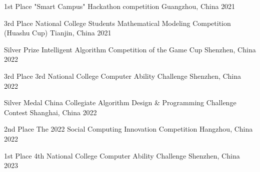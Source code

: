 \begin{cvhonors}

  \cvhonor
    {1st Place} %
    {"Smart Campus" Hackathon competition} %
    {Guangzhou, China} %
    {2021} %

  \cvhonor
    {3rd  Place} %
    {National College Students Mathematical Modeling Competition (Huashu Cup)} %
    {Tianjin, China} %
    {2021} %

  \cvhonor
    {Silver Prize} %
    {Intelligent Algorithm Competition of the Game Cup} %
    {Shenzhen, China} %
    {2022} %

  \cvhonor
    {3rd  Place} %
    {3rd National College Computer Ability Challenge} %
    {Shenzhen, China} %
    {2022} %
    
    \cvhonor
    {Silver  Medal} %
    {China Collegiate Algorithm Design \& Programming Challenge Contest
} %
    {Shanghai, China} %
    {2022} %
    
    \cvhonor
    {2nd  Place} %
    {The 2022 Social Computing Innovation Competition} %
    {Hangzhou, China} %
    {2022} %

  \cvhonor
    {1st  Place} %
    {4th National College Computer Ability Challenge} %
    {Shenzhen, China} %
    {2023} %

\end{cvhonors}




